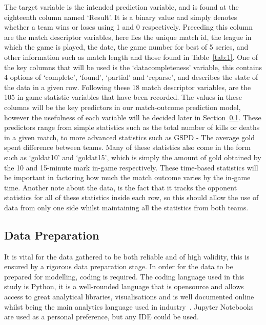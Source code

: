 The target variable is the intended prediction variable, and is found at the eighteenth column named `Result'.
It is a binary value and simply denotes whether a team wins or loses using 1 and 0 respectively.
Preceding this column are the match descriptor variables, here lies the unique match id, the league in which the game is played, the date, the game number for best of 5 series, and other information such as match length and those found in Table~\ref{tab:1}.
One of the key columns that will be used is the `datacompleteness' variable, this contains 4 options of `complete', `found', `partial' and `reparse', and describes the state of the data in a given row.
Following these 18 match descriptor variables, are the 105 in-game statistic variables that have been recorded.
The values in these columns will be the key predictors in our match-outcome prediction model, however the usefulness of each variable will be decided later in Section~\ref{subsec:Data Preparation}.
These predictors range from simple statistics such as the total number of kills or deaths in a given match, to more advanced statistics such as GSPD - The average gold spent difference between teams.
Many of these statistics also come in the form such as `goldat10' and `goldat15', which is simply the amount of gold obtained by the 10 and 15-minute mark in-game respectively.
These time-based statistics will be important in factoring how much the match outcome varies by the in-game time.
Another note about the data, is the fact that it tracks the opponent statistics for all of these statistics inside each row, so this should allow the use of data from only one side whilst maintaining all the statistics from both teams.

\subsection{Data Preparation}\label{subsec:Data Preparation}
It is vital for the data gathered to be both reliable and of high validity, this is ensured by a rigorous data preparation stage.
In order for the data to be prepared for modelling, coding is required.
The coding language used in this study is Python, it is a well-rounded language that is opensource and allows access to great analytical libraries, visualisations and is well documented online whilst being the main analytics language used in industry~\citep{tiobePython}.
Jupyter Notebooks are used as a personal preference, but any IDE could be used. \\

